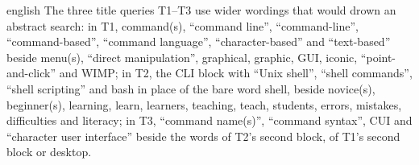\begin{onlyin}{english}
The three title queries T1--T3 use wider wordings that would drown an
abstract search: in T1, command(s), \enquote{command line},
\enquote{command-line}, \enquote{command-based}, \enquote{command
language}, \enquote{character-based} and \enquote{text-based} beside
menu(s), \enquote{direct manipulation}, graphical, graphic, GUI,
iconic, \enquote{point-and-click} and WIMP; in T2, the CLI block with
\enquote{Unix shell}, \enquote{shell commands}, \enquote{shell
scripting} and bash in place of the bare word shell, beside novice(s),
beginner(s), learning, learn, learners, teaching, teach, students,
errors, mistakes, difficulties and literacy; in T3, \enquote{command
name(s)}, \enquote{command syntax}, CUI and \enquote{character user
interface} beside the words of T2's second block, of T1's second block
or desktop.
\end{onlyin}
